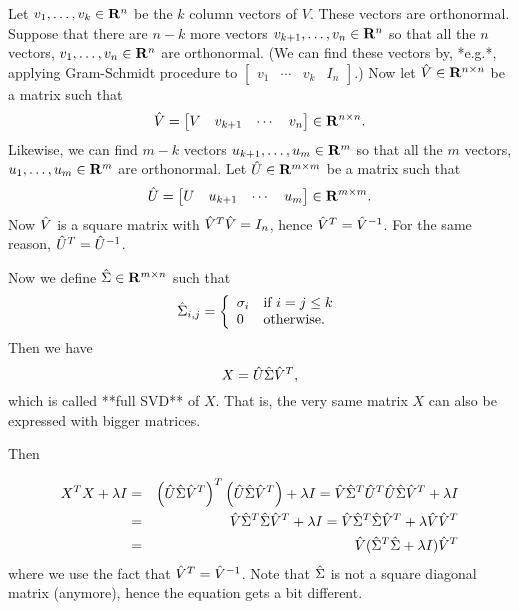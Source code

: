 \begin{enumerate}
\begin{solution}
Let $v_1, \ldots, v_k\in\mathbf{R}^n$ be the $k$ column vectors of $V$. These vectors are orthonormal.
Suppose that there are $n-k$ more vectors $v_{k+1}, \ldots, v_n\in\mathbf{R}^n$ so that all the $n$ vectors, $v_1, \ldots, v_n\in\mathbf{R}^n$ are orthonormal.
(We can find these vectors by, *e.g.*, applying Gram-Schmidt procedure to $\begin{bmatrix}v_1&\cdots&v_k&I_n\end{bmatrix}$.)
Now let $\hat{V}\in\mathbf{R}^{n\times n}$ be a matrix such that
\begin{equation}
\hat{V} = \begin{bmatrix}V&v_{k+1}&\cdots&v_n\end{bmatrix} \in\mathbf{R}^{n\times n}.
\end{equation}
Likewise, we can find $m-k$ vectors $u_{k+1}, \ldots, u_m\in\mathbf{R}^m$ so that all the $m$ vectors, $u_1, \ldots, u_m\in\mathbf{R}^m$ are orthonormal.
Let $\hat{U}\in\mathbf{R}^{m\times m}$ be a matrix such that
\begin{equation}
\hat{U} = \begin{bmatrix}U&u_{k+1}&\cdots&u_m\end{bmatrix} \in\mathbf{R}^{m\times m}.
\end{equation}
Now $\hat{V}$ is a square matrix with $\hat{V}^T \hat{V} = I_n$, hence $\hat{V}^T = \hat{V}^{-1}$.
For the same reason, $\hat{U}^T = \hat{U}^{-1}$.

Now we define $\hat{\Sigma}\in\mathbf{R}^{m\times n}$ such that
\begin{equation}
\hat{\Sigma}_{i,j} = \left\{\begin{array}{ll}
        \sigma_i & \mbox{if } i = j \leq k\\
        0 & \mbox{otherwise}.
\end{array}\right.
\end{equation}
Then we have
\begin{equation}
X = \hat{U} \hat{\Sigma} \hat{V}^T,
\end{equation}
which is called **full SVD** of $X$.
That is, the very same matrix $X$ can also be expressed with bigger matrices.

Then

\begin{eqnarray}
X^TX + \lambda I &=& \left(\hat{U}\hat{\Sigma} \hat{V}^T\right)^T\left(\hat{U} \hat{\Sigma} \hat{V}^T\right) + \lambda I
= \hat{V} \hat{\Sigma}^T \hat{U}^T \hat{U} \hat{\Sigma} \hat{V}^T + \lambda I
\\
&=& \hat{V} \hat{\Sigma}^T\hat{\Sigma}  \hat{V}^T + \lambda I
= \hat{V} \hat{\Sigma}^T\hat{\Sigma}  \hat{V}^T + \lambda \hat{V} \hat{V}^T
\\
&=& \hat{V} (\hat{\Sigma}^T\hat{\Sigma}  + \lambda I) \hat{V}^T
\end{eqnarray}
where we use the fact that $\hat{V}^T = \hat{V}^{-1}$.
Note that $\hat{\Sigma}$ is not a square diagonal matrix (anymore),
hence the equation gets a bit different.


\end{solution}
\end{enumerate}
